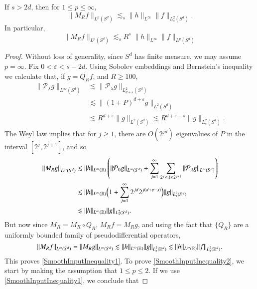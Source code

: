 \begin{lemma} \label{SmoothInputBounds}
    If $s > 2d$, then for $1 \leq p \leq \infty$,
    \begin{equation} \label{SmoothInputInequality1}
        \| M_R f \|_{L^p(S^d)} \lesssim_s \| h \|_{L^\infty} \| f \|_{L^2_s(S^d)}.
    \end{equation}
    In particular,
    \begin{equation} \label{SmoothInputInequality2}
        \| M_R f \|_{L^p(S^d)} \lesssim_s R^s\; \| h \|_{L^\infty} \| f \|_{L^p(S^d)}
    \end{equation}
\end{lemma}
\begin{proof}
    Without loss of generality, since $S^d$ has finite measure, we may assume $p = \infty$. Fix $0 < \varepsilon < s - 2d$. Using Sobolev embeddings and Bernstein's inequality we calculate that, if $g = Q_R f$, and $R \geq 100$,
    \begin{align*}
        \| \mathcal{P}_\lambda g \|_{L^\infty(S^d)} &\lesssim \| \mathcal{P}_\lambda g \|_{L^2_{d+\varepsilon}(S^d)}\\
        &\lesssim \| (1 + P)^{d+\varepsilon} g \|_{L^2(S^d)}\\
        &\lesssim R^{d+\varepsilon} \| g \|_{L^2(S^d)} \lesssim R^{d+\varepsilon-s} \| g \|_{L^2_s(S^d)}.
    \end{align*}
    The Weyl law implies that for $j \geq 1$, there are $O(2^{jd})$ eigenvalues of $P$ in the interval $[2^j,2^{j+1}]$, and so
    \begin{align*}
        \left\| M_R g \right\|_{L^\infty(S^d)} &\lesssim \| h \|_{L^\infty(\operatorname{\mathbb{R}})} \left( \| \mathcal{P}_0 g \|_{L^\infty(S^d)} + \sum_{j = 1}^\infty \sum_{2^j \leq \lambda \leq 2^{j+1}} \| \mathcal{P}_\lambda g \|_{L^\infty(S^d)} \right)\\
        &\lesssim \| h \|_{L^\infty(\operatorname{\mathbb{R}})} \Big( 1 + \sum_{j = 1}^\infty 2^{jd} 2^{j(d+\varepsilon - s)} \Big) \| g \|_{L^2_s(S^d)}\\
        &\lesssim \| h \|_{L^\infty(\operatorname{\mathbb{R}})} \| g \|_{L^2_s(S^d)}.
    \end{align*}
    But now since $M_R = M_R \circ Q_R$, $M_R f = M_R g$, and using the fact that $\{ Q_R \}$ are a uniformly bounded family of pseudodifferential operators,
    \[ \| M_R f \|_{L^\infty(S^d)} = \| M_R g \|_{L^\infty(S^d)} \lesssim \| h \|_{L^\infty(\operatorname{\mathbb{R}})} \| g \|_{L^2_s(\operatorname{\mathbb{R}}^d)} \lesssim \| h \|_{L^\infty(\operatorname{\mathbb{R}})} \| f \|_{L^2_s(\operatorname{\mathbb{R}}^d)}. \]
    This proves \eqref{SmoothInputInequality1}. To prove \eqref{SmoothInputInequality2}, we start by making the assumption that $1 \leq p \leq 2$. If we use \eqref{SmoothInputInequality1}, we conclude that

\end{proof}
